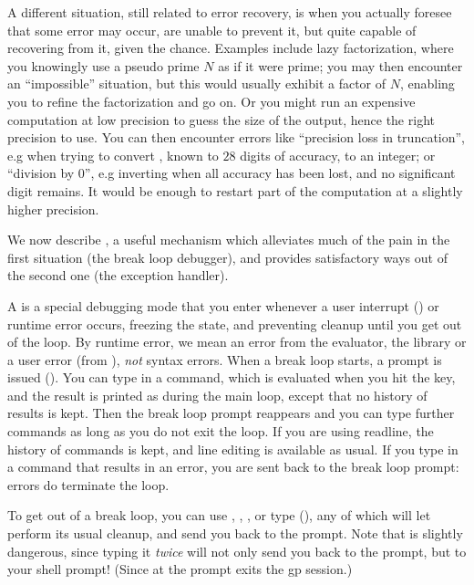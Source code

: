 A different situation, still related to error recovery, is when you
actually foresee that some error may occur, are unable to prevent it, but
quite capable of recovering from it, given the chance. Examples include lazy
factorization, where you knowingly use a pseudo prime $N$ as if it were
prime; you may then encounter an ``impossible'' situation, but this would
usually exhibit a factor of $N$, enabling you to refine the factorization and
go on. Or you might run an expensive computation at low precision to guess
the size of the output, hence the right precision to use. You can then
encounter errors like ``precision loss in truncation'', e.g when trying to
convert , known to $28$ digits of accuracy, to an integer; or
``division by 0'', e.g inverting  when all accuracy has been
lost, and no significant digit remains. It would be enough to restart part of
the computation at a slightly higher precision.

We now describe , a useful mechanism which alleviates
much of the pain in the first situation (the break loop debugger), and
provides satisfactory ways out of the second one (the  exception
handler).

\label{se:break_loop}

A  is a special debugging mode that you enter whenever a
user interrupt () or runtime error occurs, freezing the
 state, and preventing cleanup until you get out of the loop. By
runtime error, we mean an error from the evaluator, the library or a user error
(from ), \emph{not} syntax errors. When a break loop starts, a
prompt is issued (). You can type in a  command, which is
evaluated when you hit the  key, and the result is printed as
during the main  loop, except that no history of results is kept. Then
the break loop prompt reappears and you can type further commands as long as
you do not exit the loop. If you are using readline, the history of commands is
kept, and line editing is available as usual. If you type in a command that
results in an error, you are sent back to the break loop prompt: errors do
 terminate the loop.

To get out of a break loop, you can use , , ,
or type  (), any of which will let  perform its
usual cleanup, and send you back to the  prompt. Note that 
is slightly dangerous, since typing it \emph{twice} will not only send you
back to the  prompt, but to your shell prompt! (Since  at
the  prompt exits the gp session.)

